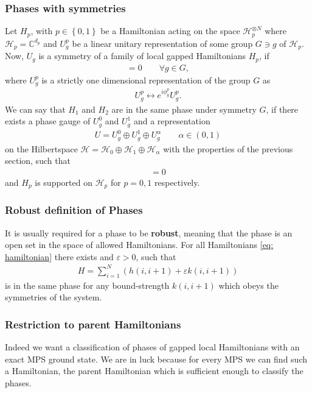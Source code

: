 \subsubsection{Phases with symmetries}
Let $H_p$, with $p \in \left\{ 0, 1 \right\} $ be a Hamiltonian acting on the
space $\mathcal{H}^{\otimes N}_p$ where $\mathcal{H}_p=\mathbb{C}^{d_p}$ and
$U_g^p$ be a linear unitary representation of some group $G \ni g$ of
$\mathcal{H}_p$. Now, $U_g$ is a symmetry of a family of local gapped
Hamiltonians $H_p$, if
\begin{align}
    [H_p, (U_g^p)^{\otimes N}] = 0 \qquad \forall g\in G,
\end{align}
where $U_g^p$ is a strictly one dimensional representation of the group $G$
as
\begin{align}
    U_g^p \leftrightarrow e^{i\phi_g^p}U_g^p.
\end{align}
We can say that $H_1$ and $H_2$ are in the same phase under symmetry $G$, if
there exists a phase gauge of $U_g^0$ and $U_g^1$ and a representation
\begin{align}
     U = U_g^0 \oplus U_g^1 \oplus U_g^{\alpha} \qquad \alpha \in (0, 1)
\end{align}
on the Hilbertspace $\mathcal{H} = \mathcal{H}_0 \oplus  \mathcal{H}_1 \oplus
\mathcal{H}_\alpha$ with the properties of the previous section, such that
\begin{align}
    [H_\gamma, U_g^{\otimes N}] = 0
\end{align}
and $H_p$ is supported on $\mathcal{H}_p$ for $p=0, 1$ respectively.
\subsubsection{Robust definition of Phases}
It is usually required for a phase to be \textbf{robust}, meaning that the
phase is an open set in the space of allowed Hamiltonians. For all
Hamiltonians \ref{eq: hamiltonian} there exists and $\varepsilon >0$, such
that
\begin{align}
    H = \sum_{i=1}^{N} \left( h(i,i+1) + \varepsilon k(i, i+1) \right)
\end{align}
is in the same phase for any bound-strength $k(i,i+1)$ which obeys the
symmetries of the system.
\subsubsection{Restriction to parent Hamiltonians}
Indeed we want a classification of phases of gapped local Hamiltonians with an
exact MPS ground state. We are in luck because for every MPS we can find such
a Hamiltonian, the parent Hamiltonian which is sufficient enough to classify
the phases.

